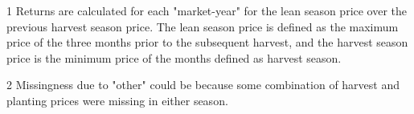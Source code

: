 \begin{table}[ht]
\begin{threeparttable}[t]
\begin{tabular}{|l|llll|ll|}
   \hline
\end{tabular}
\begin{tablenotes}
\item [1] \footnotesize Returns are calculated for each "market-year" for the lean season price over the previous harvest season price. The lean season price is defined as the maximum price of the three months prior to the subsequent harvest, and the harvest season price is the minimum price of the months defined as harvest season. 
\item [2] \footnotesize Missingness due to "other" could be because some combination of harvest and planting prices were missing in either season.
\end{tablenotes}
\end{threeparttable}
\end{table}
